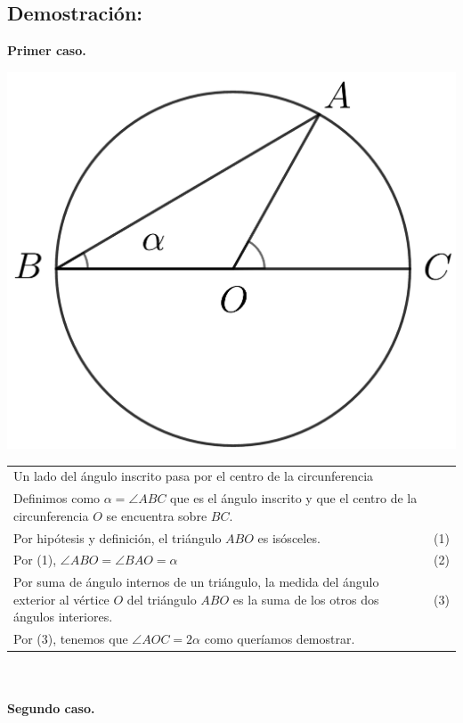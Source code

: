 \documentclass[12pt,a4paper]{article}
\begin{document}
\subsection*{Demostración:}
\textbf{Primer caso.}
\begin{center}
\includegraphics[scale=0.6]{circulo.png} 
\end{center}
\begin{tabular}{p{15.9 cm} p{1cm}}
Un lado del ángulo inscrito pasa por el centro de la circunferencia 
\\Definimos como $\alpha =\angle ABC$ que es el ángulo inscrito y que el centro de la circunferencia $O$ se encuentra sobre $BC$. 
\\Por hipótesis y definición, el triángulo $ABO$ es isósceles. &(1)
\\Por (1), $\angle ABO = \angle BAO = \alpha$ &(2)
\\Por suma de ángulo internos de un triángulo, la medida del ángulo exterior al vértice $O$ del triángulo $ABO$ es la suma de los otros dos ángulos interiores. &\medskip(3)
\\Por (3), tenemos que $\angle AOC =2 \alpha$ como queríamos demostrar.
\end{tabular}\\\\
\textbf{Segundo caso.}
\end{document}
